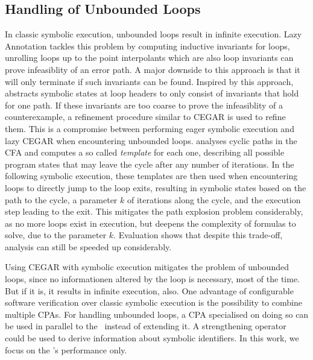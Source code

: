 \subsection*{Handling of Unbounded Loops}
In classic symbolic execution, unbounded loops result in infinite execution.
Lazy Annotation \cite{McMillan2010} tackles this problem by computing inductive invariants for loops, unrolling loops up to the point interpolants which are also loop invariants can prove infeasiblity of an error path.
A major downside to this approach is that it will only terminate if such invariants can be found.
Inspired by this approach, \cite{Jaffar2012} abstracts symbolic states at loop headers to only consist of invariants that hold for one path.
If these invariants are too coarse to prove the infeasiblity of a counterexample, a refinement procedure similar to CEGAR is used to refine them.
This is a compromise between performing eager symbolic execution and lazy CEGAR when encountering unbounded loops.
\cite{Slaby2013} analyses cyclic paths in the CFA and computes a so called \emph{template} for each one,
describing all possible program states that may leave the cycle after any number of iterations.
In the following symbolic execution, these templates are then used when encountering loops to directly jump to the loop exits, resulting in symbolic states based on the path to the cycle, a parameter $k$ of iterations along the cycle, and the execution step leading to the exit.
This mitigates the path explosion problem considerably, as no more loops exist in execution, but deepens the complexity of formulas to solve, due to the parameter $k$.
Evaluation shows that despite this trade-off, analysis can still be speeded up considerably.

Using CEGAR with symbolic execution mitigates the problem of unbounded loops, since no informationen altered by the loop is necessary, most of the time.
But if it is, it results in infinite execution, also.
One advantage of configurable software verification over classic symbolic execution is the possibility to combine multiple CPAs.
For handling unbounded loops, a CPA specialised on doing so can be used in parallel to the \symbolicExecutionCPA\ instead of extending it.
A strengthening operator could be used to derive information about symbolic identifiers.
In this work, we focus on the \symbolicExecutionCPA's performance only.

